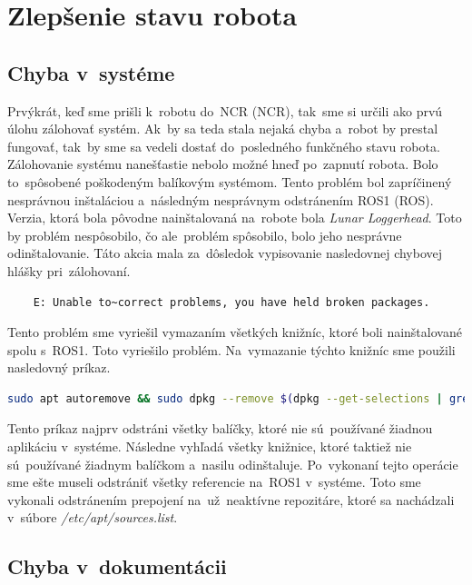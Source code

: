 
\section{Zlepšenie stavu robota}

\subsection{Chyba v~systéme}
\label{subsec:brokenSystem}

Prvýkrát, keď sme prišli k~robotu do~NCR (\acrlong{NCR}), tak~sme si určili ako prvú úlohu zálohovať systém. Ak~by sa teda stala nejaká chyba
a~robot by prestal fungovať, tak~by sme sa vedeli dostať do~posledného funkčného stavu robota. Zálohovanie systému nanešťastie nebolo možné
hneď po~zapnutí robota. Bolo to~spôsobené poškodeným balíkovým systémom. Tento problém bol zapríčinený nesprávnou
inštaláciou a~následným nesprávnym odstránením ROS1 (\acrlong{ROS}). Verzia, ktorá bola pôvodne nainštalovaná na~robote
bola \textit{Lunar Loggerhead}. Toto by problém nespôsobilo, čo ale~problém spôsobilo, bolo jeho nesprávne odinštalovanie.
Táto akcia mala za~dôsledok vypisovanie nasledovnej chybovej hlášky pri~zálohovaní.

\begin{lstlisting}
	E: Unable to~correct problems, you have held broken packages.
\end{lstlisting}

Tento problém sme vyriešil vymazaním všetkých knižníc, ktoré boli nainštalované spolu s~ROS1. Toto vyriešilo problém. Na~vymazanie týchto
knižníc sme použili nasledovný príkaz.

\begin{lstlisting}[language=bash]
	sudo apt autoremove && sudo dpkg --remove $(dpkg --get-selections | grep hold)
\end{lstlisting}

Tento príkaz najprv odstráni všetky balíčky, ktoré nie sú~používané žiadnou aplikáciu v~systéme. Následne vyhľadá všetky knižnice,
ktoré taktiež nie sú~používané žiadnym balíčkom a~nasilu odinštaluje. Po~vykonaní tejto operácie sme ešte museli odstrániť všetky referencie
na~ROS1 v~systéme. Toto sme vykonali odstránením prepojení na~už~neaktívne repozitáre, ktoré sa nachádzali v~súbore \textit{/etc/apt/sources.list}.

\subsection{Chyba v~dokumentácii}
\label{subsec:documentationIssue}

